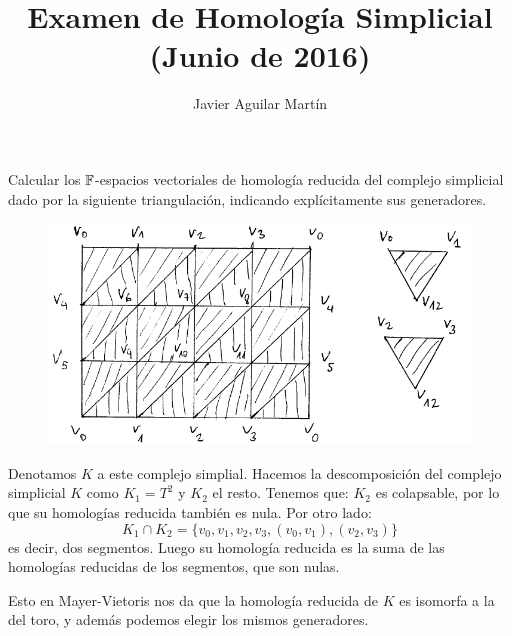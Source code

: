 \documentclass[twoside]{article}
\begin{document}
\title{Examen de Homología Simplicial (Junio de 2016)}
\author{Javier Aguilar Martín}
\maketitle

\begin{ejercicio}{1}
Calcular los $\mathbb{F}$-espacios vectoriales de homología reducida del complejo simplicial dado por la siguiente triangulación, indicando explícitamente sus generadores.
\begin{figure}[h!]
\centering
\includegraphics[scale=0.7]{Junio2016-1}
\end{figure}
\end{ejercicio}
\begin{solucion}
Denotamos $K$ a este complejo simplial. Hacemos la descomposición del complejo simplicial $K$ como $K_1=T^2$ y $K_2$ el resto. Tenemos que:
$K_2$ es colapsable, por lo que su homologías reducida también es nula.
Por otro lado:
\[ K_1 \cap K_2 = \{ v_0, v_1, v_2, v_3, (v_0, v_1), (v_2, v_3) \} \]
es decir, dos segmentos.
Luego su homología reducida es la suma de las homologías reducidas de los segmentos, que son nulas.

Esto en Mayer-Vietoris nos da que la homología reducida de $K$ es isomorfa a la del toro, y además podemos elegir los mismos generadores.
\end{solucion}

\newpage
\end{document}
